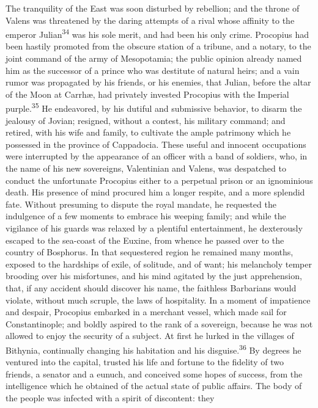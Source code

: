 {{{{{{{{{{{{{{{{{{{{{{{{{{{{{{{{{{{{The tranquility of the East was soon disturbed by rebellion; and
the throne of Valens was threatened by the daring attempts of a
rival whose affinity to the emperor Julian\textsuperscript{34} was his sole merit,
and had been his only crime. Procopius had been hastily promoted
from the obscure station of a tribune, and a notary, to the joint
command of the army of Mesopotamia; the public opinion already
named him as the successor of a prince who was destitute of
natural heirs; and a vain rumor was propagated by his friends, or
his enemies, that Julian, before the altar of the Moon at Carrhæ,
had privately invested Procopius with the Imperial purple.\textsuperscript{35} He
endeavored, by his dutiful and submissive behavior, to disarm the
jealousy of Jovian; resigned, without a contest, his military
command; and retired, with his wife and family, to cultivate the
ample patrimony which he possessed in the province of Cappadocia.
These useful and innocent occupations were interrupted by the
appearance of an officer with a band of soldiers, who, in the
name of his new sovereigns, Valentinian and Valens, was
despatched to conduct the unfortunate Procopius either to a
perpetual prison or an ignominious death. His presence of mind
procured him a longer respite, and a more splendid fate. Without
presuming to dispute the royal mandate, he requested the
indulgence of a few moments to embrace his weeping family; and
while the vigilance of his guards was relaxed by a plentiful
entertainment, he dexterously escaped to the sea-coast of the
Euxine, from whence he passed over to the country of Bosphorus.
In that sequestered region he remained many months, exposed to
the hardships of exile, of solitude, and of want; his melancholy
temper brooding over his misfortunes, and his mind agitated by
the just apprehension, that, if any accident should discover his
name, the faithless Barbarians would violate, without much
scruple, the laws of hospitality. In a moment of impatience and
despair, Procopius embarked in a merchant vessel, which made sail
for Constantinople; and boldly aspired to the rank of a
sovereign, because he was not allowed to enjoy the security of a
subject. At first he lurked in the villages of Bithynia,
continually changing his habitation and his disguise.\textsuperscript{36} By
degrees he ventured into the capital, trusted his life and
fortune to the fidelity of two friends, a senator and a eunuch,
and conceived some hopes of success, from the intelligence which
he obtained of the actual state of public affairs. The body of
the people was infected with a spirit of discontent: they
}}}}}}}}}}}}}}}}}}}}}}}}}}}}}}}}}}}}
